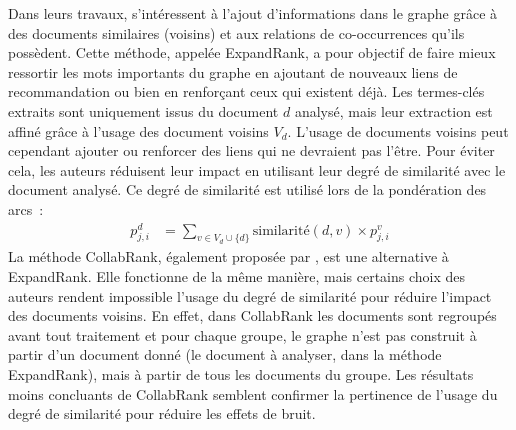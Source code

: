         Dans leurs travaux,  s'intéressent à l'ajout
        d'informations dans le graphe grâce à des documents similaires
        (voisins) et aux relations de co-occurrences qu'ils possèdent. Cette
        méthode, appelée ExpandRank, a pour objectif de faire mieux ressortir
        les mots importants du graphe en ajoutant de nouveaux liens de
        recommandation ou bien en renforçant ceux qui existent déjà. Les
        termes-clés extraits sont uniquement issus du document $d$ analysé,
        mais leur extraction est affiné grâce à l'usage des document voisins
        $V_d$. L'usage de documents voisins peut cependant ajouter ou
        renforcer des liens qui ne devraient pas l'être. Pour éviter cela, les
        auteurs réduisent leur impact en utilisant leur degré de similarité
        avec le document analysé. Ce degré de similarité est utilisé lors de
        la pondération des arcs~:
        \begin{align}
          p_{j, i}^d &= \sum_{v \in V_d \cup \{d\}} \text{similarité}(d, v) \times p_{j, i}^v
        \end{align}
        La méthode CollabRank, également proposée par
        , est une alternative à ExpandRank. Elle
        fonctionne de la même manière, mais certains choix des auteurs rendent
        impossible l'usage du degré de similarité pour réduire l'impact des
        documents voisins. En effet, dans CollabRank les documents sont
        regroupés avant tout traitement et pour chaque groupe, le graphe n'est
        pas construit à partir d'un document donné (le document à analyser,
        dans la méthode ExpandRank), mais à partir de tous les documents du
        groupe. Les résultats moins concluants de CollabRank semblent
        confirmer la pertinence de l'usage du degré de similarité pour réduire
        les effets de bruit.

